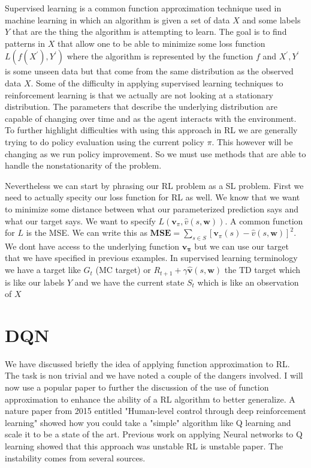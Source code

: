 Supervised learning is a common function approximation technique used in machine learning in which an algorithm is given a set of data $X$ and some labels $Y$ that are the thing the algorithm is attempting to learn. The goal is to find patterns in $X$ that allow one to be able to minimize some loss function $L(f(X^{'}),Y^{'})$ where the algorithm is represented by the function $f$ and $X^{'},Y^{'}$ is some unseen data but that come from the same distribution as the observed data $X$. Some of the difficulty in applying supervised learning techniques to reinforcement learning is that we actually are not looking at a stationary distribution. The parameters that describe the underlying distribution are capable of changing over time and as the agent interacts with the environment. To further highlight difficulties with using this approach in RL we are generally trying to do policy evaluation  using the current policy $\pi$. This however will be changing as we run policy improvement. So we must use methods that are able to handle the nonstationarity of the problem. 

Nevertheless we can start by phrasing our RL problem as a SL problem. First we need to actually specity our loss function for RL as well. We know that we want to minimize some distance between what our parameterized prediction says and what our target says. We want to specify $L (\mathbf{v}_{\pi},\hat{v}(s,\mathbf{w}))$. A common function for $L$ is the MSE. We can write this as $\mathbf{MSE} = \sum_{s \in S} [\mathbf{v}_{\pi}(s) - \hat{v}(s,\mathbf{w})]^{2}$. We dont have access to the underlying function $\mathbf{v_{\pi}}$ but we can use our target that we have specified in previous examples. In supervised learning terminology we have a target like $G_{t}$ (MC target) or $ R_{t + 1} + \gamma \hat{\mathbf{v}}(s,\mathbf{w})$ the TD target which is like our labels $Y$ and we have the current state $S_{t}$ which is like an observation of $X$

\section{DQN}

We have discussed briefly the idea of applying function approximation to RL. The task is non trivial and we have noted a couple of the dangers involved. I will now use a popular paper to further the discussion of the use of function approximation to enhance the ability of a RL algorithm to better generalize. A nature paper from 2015 entitled "Human-level control through deep reinforcement learning" showed how you could take a "simple" algorithm like Q learning and scale it to be a state of the art. Previous work on applying Neural networks to Q learning showed that this approach was unstable {RL is unstable paper}. The instability comes from several sources. 

